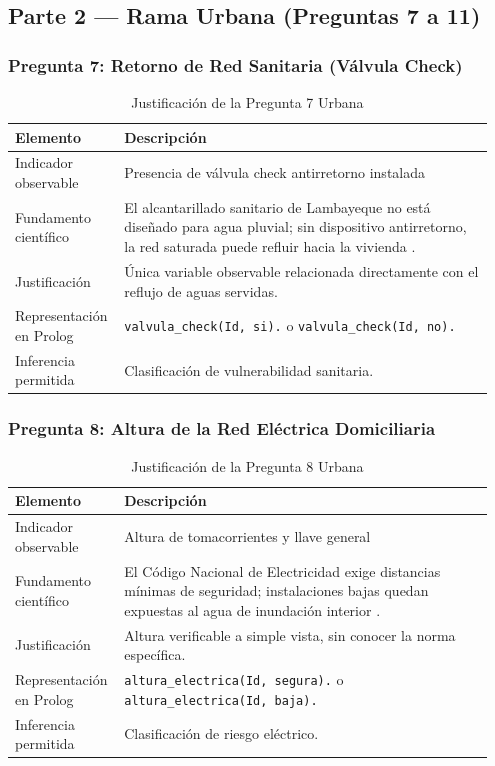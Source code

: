 \documentclass[12pt, letterpaper]{article}
\begin{document}
\subsection{Parte 2 — Rama Urbana (Preguntas 7 a 11)}

\subsubsection*{Pregunta 7: Retorno de Red Sanitaria (Válvula Check)}
\begin{table}[H]
\centering
\caption{Justificación de la Pregunta 7 Urbana}
\label{tab:p7u}
\begin{tabular}{@{}p{0.2\linewidth}p{0.75\linewidth}@{}}
\toprule
\textbf{Elemento} & \textbf{Descripción} \\ \midrule
Indicador observable & Presencia de válvula check antirretorno instalada \\
Fundamento científico & El alcantarillado sanitario de Lambayeque no está diseñado para agua pluvial; sin dispositivo antirretorno, la red saturada puede refluir hacia la vivienda \parencite{usat_drenaje}. \\
Justificación & Única variable observable relacionada directamente con el reflujo de aguas servidas. \\
Representación en Prolog & \texttt{valvula\_check(Id, si).} o \texttt{valvula\_check(Id, no).} \\
Inferencia permitida & Clasificación de vulnerabilidad sanitaria. \\ \bottomrule
\end{tabular}
\end{table}

\subsubsection*{Pregunta 8: Altura de la Red Eléctrica Domiciliaria}
\begin{table}[H]
\centering
\caption{Justificación de la Pregunta 8 Urbana}
\label{tab:p8u}
\begin{tabular}{@{}p{0.2\linewidth}p{0.75\linewidth}@{}}
\toprule
\textbf{Elemento} & \textbf{Descripción} \\ \midrule
Indicador observable & Altura de tomacorrientes y llave general \\
Fundamento científico & El Código Nacional de Electricidad exige distancias mínimas de seguridad; instalaciones bajas quedan expuestas al agua de inundación interior \parencite{osinergmin_cne}. \\
Justificación & Altura verificable a simple vista, sin conocer la norma específica. \\
Representación en Prolog & \texttt{altura\_electrica(Id, segura).} o \texttt{altura\_electrica(Id, baja).} \\
Inferencia permitida & Clasificación de riesgo eléctrico. \\ \bottomrule
\end{tabular}
\end{table}
\end{document}
